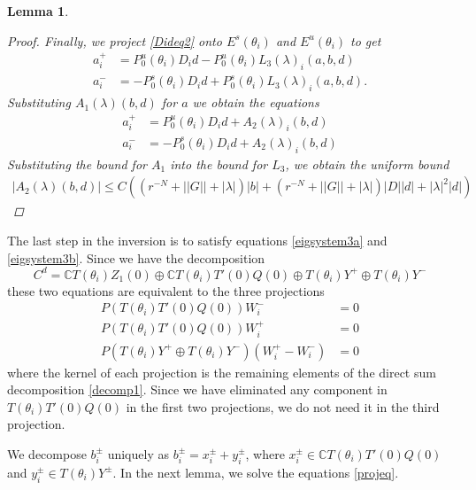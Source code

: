 \documentclass[12pt]{article}
\def\C{{\mathbb C}}
\newtheorem{lemma}{Lemma}
\begin{document}
\begin{lemma}
\begin{proof}
\noindent Finally, we project \eqref{Dideq2} onto $E^s(\theta_i)$ and $E^u(\theta_i)$ to get
\begin{align*}
a_i^+ &= P_0^u(\theta_i) D_i d - P_0^u(\theta_i) L_3(\lambda)_i(a,b,d) \\
a_i^- &= -P_0^s(\theta_i) D_i d + P_0^s(\theta_i) L_3(\lambda)_i(a,b,d).
\end{align*}
Substituting $A_1(\lambda)(b,d)$ for $a$ we obtain the equations
\begin{align*}
a_i^+ &= P_0^u(\theta_i) D_i d + A_2(\lambda)_i(b,d) \\
a_i^- &= -P_0^s(\theta_i) D_i d + A_2(\lambda)_i(b,d)
\end{align*}
Substituting the bound for $A_1$ into the bound for $L_3$, we obtain the uniform bound
\begin{align*}
|A_2(\lambda)(b,d)| \leq 
C\left( (r^{-N} + ||G|| + |\lambda| )|b| + (r^{-N} + ||G|| + |\lambda|)|D||d| + |\lambda|^2 |d|  \right)
\end{align*}
\end{proof}
\end{lemma}

The last step in the inversion is to satisfy equations \eqref{eigsystem3a} and \eqref{eigsystem3b}. Since we have the decomposition
\begin{equation}\label{decomp1}
C^d = \C T(\theta_i) Z_1(0) \oplus \C T(\theta_i) T'(0)Q(0) \oplus T(\theta_i) Y^+ \oplus T(\theta_i) Y^-
\end{equation}
these two equations are equivalent to the three projections
\begin{equation}\label{projeq}
\begin{aligned}
P(T(\theta_i) T'(0)Q(0)) W_i^- &= 0 \\
P(T(\theta_i) T'(0)Q(0)) W_i^+ &= 0 \\
P(T(\theta_i) Y^+ \oplus T(\theta_i) Y^-) (W_i^+ - W_i^-) &= 0
\end{aligned}
\end{equation}
where the kernel of each projection is the remaining elements of the direct sum decomposition \eqref{decomp1}. Since we have eliminated any component in $T(\theta_i) T'(0)Q(0)$ in the first two projections, we do not need it in the third projection.

We decompose $b_i^\pm$ uniquely as $b_i^\pm = x_i^\pm + y_i^\pm$, where $x_i^\pm \in \C T(\theta_i) T'(0)Q(0)$ and $y_i^\pm \in T(\theta_i) Y^\pm$. In the next lemma, we solve the equations \eqref{projeq}.
\end{document}
